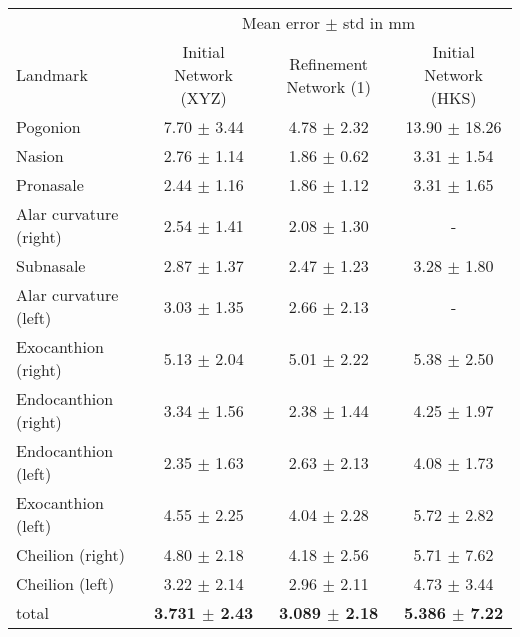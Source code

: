 \documentclass[class=article, crop=false]{standalone}
\begin{document}
\begin{table*}[!htbp]
\label{table:ref_hks}
\begin{tabularx}{\textwidth}{l|c|c|c}
\toprule
 & \multicolumn{3}{c}{Mean error $\pm$ std in mm} \\\cmidrule(lr){2-4}
Landmark               & \hspace{0.3cm}Initial Network (XYZ) \hspace{0.3cm}  & \hspace{0.3cm} Refinement Network (1) \hspace{0.3cm} & \hspace{0.3cm} Initial Network (HKS) \hspace{0.3cm}     
\\
\midrule
Pogonion               & 7.70 $\pm$ 3.44 & 4.78 $\pm$ 2.32 & 13.90 $\pm$ 18.26\\
Nasion                 & 2.76 $\pm$ 1.14 & 1.86 $\pm$ 0.62 & 3.31 $\pm$ 1.54\\
Pronasale              & 2.44 $\pm$ 1.16 & 1.86 $\pm$ 1.12 & 3.31 $\pm$ 1.65\\
Alar curvature (right) & 2.54 $\pm$ 1.41 & 2.08 $\pm$ 1.30 & -\\
Subnasale              & 2.87 $\pm$ 1.37 & 2.47 $\pm$ 1.23 & 3.28 $\pm$ 1.80\\
Alar curvature (left)  & 3.03 $\pm$ 1.35 & 2.66 $\pm$ 2.13 & - \\
Exocanthion (right)    & 5.13 $\pm$ 2.04 & 5.01 $\pm$ 2.22 & 5.38 $\pm$ 2.50\\
Endocanthion (right)   & 3.34 $\pm$ 1.56 & 2.38 $\pm$ 1.44 & 4.25 $\pm$ 1.97\\
Endocanthion (left)    & 2.35 $\pm$ 1.63 & 2.63 $\pm$ 2.13 & 4.08 $\pm$ 1.73\\
Exocanthion (left)     & 4.55 $\pm$ 2.25 & 4.04 $\pm$ 2.28 & 5.72 $\pm$ 2.82\\
Cheilion (right)       & 4.80 $\pm$ 2.18 & 4.18 $\pm$ 2.56 & 5.71 $\pm$ 7.62\\
Cheilion (left)        & 3.22 $\pm$ 2.14 & 2.96 $\pm$ 2.11 & 4.73 $\pm$ 3.44\\
\bottomrule
total & \textbf{3.731 $\pm$ 2.43} & \textbf{3.089 $\pm$ 2.18} & \textbf{5.386 $\pm$ 7.22}
\end{tabularx}
\end{table*}
\end{document}
